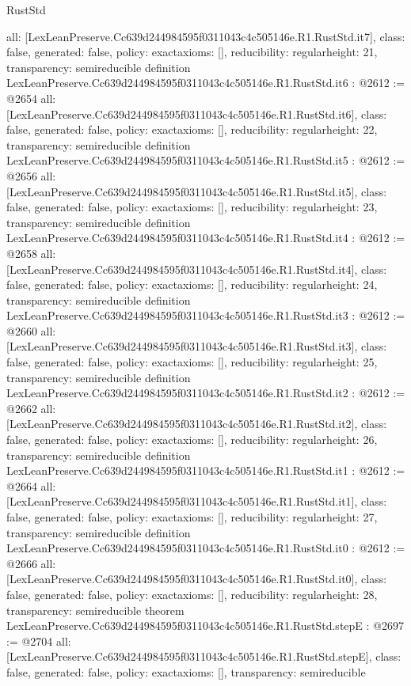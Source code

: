 \begin{lexlean}{RustStd}
\begin{coremodule}
{  all: [LexLeanPreserve.Cc639d244984595f0311043c4c505146e.R1.RustStd.it7],
  class: false,
  generated: false,
  policy: exact{axioms: []},
  reducibility: regular{height: 21},
  transparency: semireducible
}
definition LexLeanPreserve.Cc639d244984595f0311043c4c505146e.R1.RustStd.it6 : @2612 := @2654 {
  all: [LexLeanPreserve.Cc639d244984595f0311043c4c505146e.R1.RustStd.it6],
  class: false,
  generated: false,
  policy: exact{axioms: []},
  reducibility: regular{height: 22},
  transparency: semireducible
}
definition LexLeanPreserve.Cc639d244984595f0311043c4c505146e.R1.RustStd.it5 : @2612 := @2656 {
  all: [LexLeanPreserve.Cc639d244984595f0311043c4c505146e.R1.RustStd.it5],
  class: false,
  generated: false,
  policy: exact{axioms: []},
  reducibility: regular{height: 23},
  transparency: semireducible
}
definition LexLeanPreserve.Cc639d244984595f0311043c4c505146e.R1.RustStd.it4 : @2612 := @2658 {
  all: [LexLeanPreserve.Cc639d244984595f0311043c4c505146e.R1.RustStd.it4],
  class: false,
  generated: false,
  policy: exact{axioms: []},
  reducibility: regular{height: 24},
  transparency: semireducible
}
definition LexLeanPreserve.Cc639d244984595f0311043c4c505146e.R1.RustStd.it3 : @2612 := @2660 {
  all: [LexLeanPreserve.Cc639d244984595f0311043c4c505146e.R1.RustStd.it3],
  class: false,
  generated: false,
  policy: exact{axioms: []},
  reducibility: regular{height: 25},
  transparency: semireducible
}
definition LexLeanPreserve.Cc639d244984595f0311043c4c505146e.R1.RustStd.it2 : @2612 := @2662 {
  all: [LexLeanPreserve.Cc639d244984595f0311043c4c505146e.R1.RustStd.it2],
  class: false,
  generated: false,
  policy: exact{axioms: []},
  reducibility: regular{height: 26},
  transparency: semireducible
}
definition LexLeanPreserve.Cc639d244984595f0311043c4c505146e.R1.RustStd.it1 : @2612 := @2664 {
  all: [LexLeanPreserve.Cc639d244984595f0311043c4c505146e.R1.RustStd.it1],
  class: false,
  generated: false,
  policy: exact{axioms: []},
  reducibility: regular{height: 27},
  transparency: semireducible
}
definition LexLeanPreserve.Cc639d244984595f0311043c4c505146e.R1.RustStd.it0 : @2612 := @2666 {
  all: [LexLeanPreserve.Cc639d244984595f0311043c4c505146e.R1.RustStd.it0],
  class: false,
  generated: false,
  policy: exact{axioms: []},
  reducibility: regular{height: 28},
  transparency: semireducible
}
theorem LexLeanPreserve.Cc639d244984595f0311043c4c505146e.R1.RustStd.stepE : @2697 := @2704 {
  all: [LexLeanPreserve.Cc639d244984595f0311043c4c505146e.R1.RustStd.stepE],
  class: false,
  generated: false,
  policy: exact{axioms: []},
  transparency: semireducible
}
\end{coremodule}
\end{lexlean}
